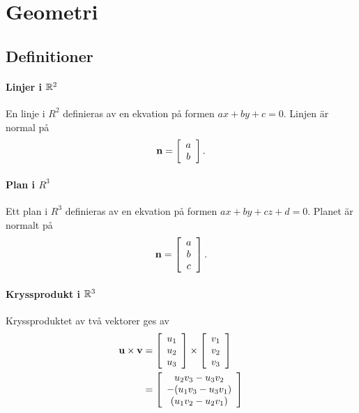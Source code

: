 \section{Geometri}

\subsection{Definitioner}

\paragraph{Linjer i $\mathbb{R}^2$}
En linje i $R^2$ definieras av en ekvation på formen $ax + by + c = 0$. Linjen är normal på
\begin{align*}
	\vect{n} = 
	\left[\begin{array}{c}
		a \\
		b
	\end{array}\right].
\end{align*}

\paragraph{Plan i $R^3$}
Ett plan i $R^3$ definieras av en ekvation på formen $ax + by + cz + d = 0$. Planet är normalt på
\begin{align*}
	\vect{n} = 
	\left[\begin{array}{c}
		a \\
		b \\
		c
	\end{array}\right].
\end{align*}

\paragraph{Kryssprodukt i $\mathbb{R}^3$}
Kryssproduktet av två vektorer ges av
\begin{align*}
	\vect{u}\times \vect{v} &=
	\left[\begin{array}{c}
		u_1 \\
		u_2 \\
		u_3
	\end{array}\right]
	\times
	\left[\begin{array}{c}
		v_1 \\
		v_2 \\
		v_3
	\end{array}\right] \\
	                        &=
	\left[\begin{array}{c}
		u_2v_3 - u_3v_2 \\
		-(u_1v_3 - u_3v_1) \\
		(u_1v_2 - u_2v_1)
	\end{array}\right]
\end{align*}

